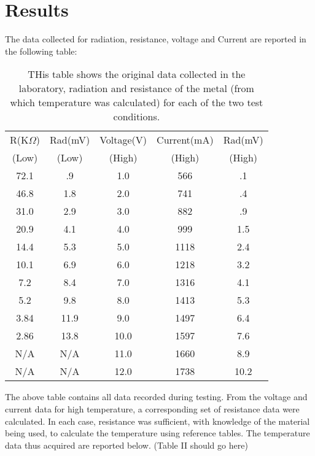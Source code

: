 \documentclass[aps,pre,twocolumn,nofootinbib]{revtex4}
\begin{document}
\section{Results}
The data collected for radiation, resistance, voltage and Current are reported in the following table: 
\begin{table}[h]
	\caption{THis table shows the original data collected in the laboratory, radiation and resistance of the metal (from which temperature was calculated) for each of the two test conditions.}
\begin{ruledtabular}
	\begin{tabular}{ccccc} 
	R(K$\Omega$) & Rad(mV) & Voltage(V) & Current(mA) & Rad(mV)\\ 
	(Low) & (Low) & (High) & (High) & (High)\\ \hline
	72.1 & .9 & 1.0 & 566 & .1\\
	46.8 & 1.8 & 2.0 & 741 & .4\\
	31.0 & 2.9 & 3.0 & 882 & .9\\
	20.9 & 4.1 & 4.0 & 999 & 1.5\\
	14.4 & 5.3 & 5.0 & 1118 & 2.4\\
	10.1 & 6.9 & 6.0 & 1218 & 3.2\\
	7.2 & 8.4 & 7.0 & 1316 & 4.1\\
	5.2 & 9.8 & 8.0 & 1413 & 5.3\\
	3.84 & 11.9 & 9.0 & 1497 & 6.4\\
	2.86 & 13.8 & 10.0 & 1597 & 7.6\\
	N/A & N/A & 11.0 & 1660 & 8.9\\
	N/A & N/A & 12.0 & 1738 & 10.2\\
	\end{tabular}
	\end{ruledtabular}
	\label{data}
\end{table}
The above table contains all data recorded during testing.  From the voltage and current data for high temperature, a corresponding set of resistance data were calculated.  In each case, resistance was sufficient, with knowledge of the material being used, to calculate the temperature using reference tables.  The temperature data thus acquired are reported below.  (Table II should go here)
\end{document}
